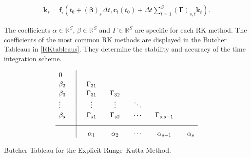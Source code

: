 	\begin{align}
		\mathbf{k}_s = \mathbf{f}_i \left( t_0 +(\mathbf{\beta})_s \Delta t, \mathbf{c}_i (t_0) + \Delta t \sum\limits_{t = 1}^{S}\boldsymbol{(\Gamma)}_{s,t}\mathbf{k}_t\right).
	\end{align}
	
	The coefficients $\alpha \in \mathbb{R}^S$, $\beta \in \mathbb{R}^S$ and $\Gamma \in \mathbb{R}^S$ are specific for each RK method. The coefficients of the most common RK methods are displayed in the Butcher Tableaus in \ref{RKtableaus}. They determine the stability and accuracy of the time integration scheme. \\
\begin{table}[h]
	\begin{equation*}
		\begin{array}{l | c c c c c}
			\rule{0pt}{2,3ex} 0      \quad &             &               &              &         &   \\
			\rule{0pt}{2,3ex} \beta_2    \quad & \quad \Gamma_{21}  &              &              &         &   \\
			\rule{0pt}{2,3ex} \beta_3    \quad & \quad \Gamma_{31}  & \quad \Gamma_{32}  &              &         &   \\
			\rule{0pt}{2,3ex} \vdots \quad & \quad \vdots & \quad \vdots & \quad \ddots &         &   \\
			\rule{0pt}{2,3ex} \beta_s    \quad & \quad \Gamma_{s1}  & \quad \Gamma_{s2}  & \quad \cdots & \quad \Gamma_{s,s-1} & \\[2,0ex] \hline
			\rule{0pt}{3,3ex}              & \quad \alpha_{1}  & \quad \alpha_{2}    & \quad \cdots & \quad \alpha_{s-1}  & \quad \alpha_{s}
		\end{array}
	\end{equation*}
	\caption{Butcher Tableau for the Explicit Runge–Kutta Method.}
	\label{tab:RKexplicit}
\end{table}		

